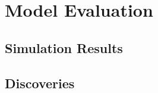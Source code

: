 \chapter{Model Evaluation}
\label{chapter:model-evaluation}

\section{Simulation Results}

\section{Discoveries}


